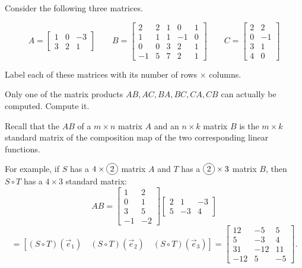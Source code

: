\begin{activity}{10}
Consider the following three matrices.

\[
  A = \begin{bmatrix}1&0&-3\\3&2&1\end{bmatrix}
    \hspace{2em}
  B = \begin{bmatrix}2&2&1&0&1\\1&1&1&-1&0\\0&0&3&2&1\\-1&5&7&2&1\end{bmatrix}
    \hspace{2em}
  C = \begin{bmatrix}2&2\\0&-1\\3&1\\4&0\end{bmatrix}
\]

\begin{subactivity}
Label each of these matrices
with its number of rows \(\times\) columns.
\end{subactivity}
\begin{subactivity} 
Only one of the matrix products
\(AB,AC,BA,BC,CA,CB\) can actually be computed.
Compute it.
\end{subactivity}
\end{activity}



\begin{remark}
Recall that the  \(AB\) of a 
\(m \times n\) matrix \(A\) and an \(n \times k\)
matrix \(B\) is the \(m \times k\) 
standard matrix of the composition map of the
two corresponding linear functions.

\vspace{1em}

For example, if \(S\) has a 
\(4\times \circledNumber{2}\) matrix \(A\) and
\(T\) has a \(\circledNumber{2}\times 3\) matrix 
\(B\), then \(S\circ T\) has a
\(4\times 3\) standard matrix:
\[
  AB
    =
  \begin{bmatrix} 1 & 2 \\ 0 & 1 \\ 3 & 5 \\ -1 & -2 \end{bmatrix}
  \begin{bmatrix} 2 & 1 & -3 \\ 5 & -3 & 4 \end{bmatrix}
\]
\[
    =
  \left[
  (S \circ T)(\vec{e}_1) \hspace{1em}
  (S\circ T)(\vec{e}_2) \hspace{1em}
  (S \circ T)(\vec{e}_3)
  \right]
    =
  \begin{bmatrix}
    12 & -5 & 5 \\
    5 & -3 & 4 \\
    31 & -12 & 11 \\
    -12 & 5 & -5
  \end{bmatrix}
.\]
\end{remark}






